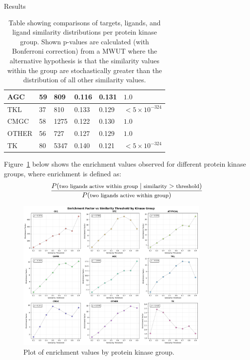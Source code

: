 \documentclass[final]{beamer}
\newlength{\colwidth}
\begin{document}
\begin{frame}[t]
\begin{columns}[t]
\begin{column}{\colwidth}
\begin{block}{Results}
\begin{table}[!ht]
\begin{tabular}{l|l|l|l|l|l}
        AGC & 59 & 809 & 0.116 & 0.131 & $1.0$ \\ \hline
        TKL & 37 & 810 & 0.133 & 0.129 & $< 5 \times 10^{-324}$ \\ \hline
        CMGC & 58 & 1275 & 0.122 & 0.130 & $1.0$ \\ \hline
        OTHER & 56 & 727 & 0.127 & 0.129 & $1.0$ \\ \hline
        TK & 80 & 5347 & 0.140 & 0.121 & $< 5 \times 10^{-324}$ \\ \hline
    \end{tabular}
    \caption{Table showing comparisons of targets, ligands, and ligand similarity distributions per protein kinase group. Shown p-values are calculated (with Bonferroni correction) from a MWUT where the alternative hypothesis is that the similarity values within the group are stochastically greater than the distribution of all other similarity values.}\label{results_table}
    \end{table}
    Figure~\ref{enrichment_plot} below shows the enrichment values observed for different protein kinase groups, where enrichment is defined as:
    \begin{equation*}
        \footnotesize
        \frac{P(\text{two ligands active within group} \; | \; \text{similarity} > \text{threshold})}{P(\text{two ligands active within group})}
    \end{equation*}
    \begin{figure}
        \centering
        \includegraphics[width=0.85\textwidth]{../figures/enrichment_factor_by_group.png}
        \caption{Plot of enrichment values by protein kinase group.}
        \label{enrichment_plot}
    \end{figure}


\end{block}
\end{column}
\end{columns}
\end{frame}
\end{document}
